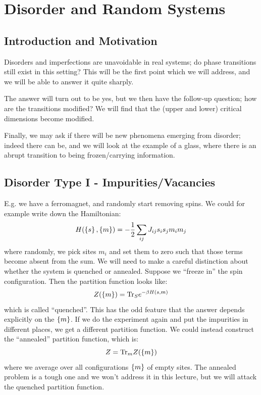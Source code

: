 \section{Disorder and Random Systems}

\subsection{Introduction and Motivation}
Disorders and imperfections are unavoidable in real systems; do phase transitions still exist in this setting? This will be the first point which we will address, and we will be able to answer it quite sharply.

The answer will turn out to be yes, but we then have the follow-up question; how are the transitions modified? We will find that the (upper and lower) critical dimensions become modified.

Finally, we may ask if there will be new phenomena emerging from disorder; indeed there can be, and we will look at the example of a glass, where there is an abrupt transition to being frozen/carrying information.


\subsection{Disorder Type I - Impurities/Vacancies}
E.g. we have a ferromagnet, and randomly start removing spins. We could for example write down the Hamiltonian:
\begin{equation}
    H(\set{s},\set{m}) = -\frac{1}{2}\sum_{ij}J_{ij}s_is_jm_im_j
\end{equation}
where randomly, we pick sites $m_i$ and set them to zero such that those terms become absent from the sum. We will need to make a careful distinction about whether the system is quenched or annealed. Suppose we ``freeze in'' the spin configuration. Then the partition function looks like:
\begin{equation}
    Z(\set{m}) = \mathrm{Tr}_S e^{-\beta H(s, m)}
\end{equation}
which is called ``quenched''. This has the odd feature that the answer depends explicitly on the $\set{m}$. If we do the experiment again and put the impurities in different places, we get a different partition function. We could instead construct the ``annealed'' partition function, which is:
\begin{equation}
    Z = \mathrm{Tr}_m Z(\set{m})
\end{equation}
where we average over all configurations $\set{m}$ of empty sites. The annealed problem is a tough one and we won't address it in this lecture, but we will attack the quenched partition function.

